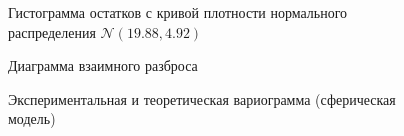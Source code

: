 \begin{figure}[H]
\caption{Гистограмма остатков с кривой плотности нормального распределения $\mathcal{N}(19.88, 4.92)$}
\label{img:resid_hist}
\end{figure}

\begin{figure}[H]
\caption{Диаграмма взаимного разброса}
\label{img:hscat}
\end{figure}

\begin{figure}[H]
\caption{Экспериментальная и теоретическая вариограмма (сферическая модель)}
\label{img:manual-variogram}
\end{figure}


